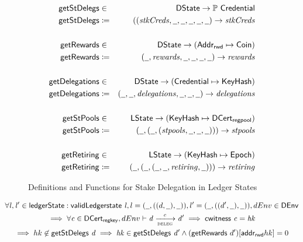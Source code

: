 \begin{figure}[ht]
  \centering
  \begin{align*}
    \fun{getStDelegs} & \in & \DState \to \powerset \Credential \\
    \fun{getStDelegs} & \coloneqq &
                                    ((\var{stkCreds}, \wcard,
                                    \wcard,\wcard,\wcard,\wcard) \to \var{stkCreds} \\
                      &&\\
    \fun{getRewards} & \in & \DState \to (\AddrRWD \mapsto \Coin) \\
    \fun{getRewards} & \coloneqq & (\wcard, \var{rewards},
                                   \wcard,\wcard,\wcard,\wcard)
                                   \to \var{rewards} \\
                      &&\\
    \fun{getDelegations} & \in & \DState \to (\Credential \mapsto \KeyHash) \\
    \fun{getDelegations} & \coloneqq & (\wcard, \wcard,
                                       \var{delegations},\wcard,\wcard,\wcard) \to
                                       \var{delegations} \\
                      &&\\
    \fun{getStPools} & \in & \LState \to (\KeyHash \mapsto \DCertRegPool) \\
    \fun{getStPools} & \coloneqq & (\wcard, (\wcard,
                                   (\var{stpools},\wcard,\wcard,\wcard))) \to \var{stpools} \\
                      &&\\
    \fun{getRetiring} & \in & \LState \to (\KeyHash \mapsto \Epoch) \\
    \fun{getRetiring} & \coloneqq & (\wcard, (\wcard,
                                    (\wcard, \wcard, \var{retiring},\wcard))) \to \var{retiring} \\
  \end{align*}
  \caption{Definitions and Functions for Stake Delegation in Ledger States}
  \label{fig:stake-delegation-functions}
\end{figure}


\begin{property}
  \begin{multline*}
    \forall \var{l}, \var{l'} \in \ledgerState: \applyFun{validLedgerstate}{l},
    l = (\wcard, ((d, \wcard), \wcard)), l' = (\wcard, ((d',\wcard), \wcard)), dEnv\in\DEnv \\
    \implies \forall \var{c} \in \DCertRegKey, dEnv\vdash \var{d}
    \trans{deleg}{c} \var{d'} \implies \applyFun{cwitness}{c} = \var{hk}\\
    \implies hk\not\in \fun{getStDelegs}~\var{d} \implies \var{hk} \in
    \applyFun{getStDelegs}{d'} \wedge
    (\applyFun{getRewards}\var{d'})[\fun{addr_{rwd}}{hk}] = 0
  \end{multline*}
  \label{prop:ledger-properties-6}
\end{property}

